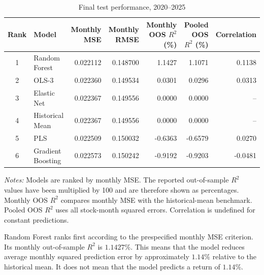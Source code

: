 \documentclass[11pt,a4paper]{article}
\begin{document}
\begin{table}[H]
\centering
\caption{Final test performance, 2020--2025}
\label{tab:test-results}

\small
\setlength{\tabcolsep}{3.8pt}

\begin{tabular}{clrrrrr}
\toprule
Rank
& Model
& Monthly MSE
& Monthly RMSE
& Monthly OOS \(R^2\) (\%)
& Pooled OOS \(R^2\) (\%)
& Correlation \\
\midrule

1 & Random Forest
  & 0.022112 & 0.148700 &  1.1427 &  1.1071 &  0.1138 \\

2 & OLS-3
  & 0.022360 & 0.149534 &  0.0301 &  0.0296 &  0.0313 \\

3 & Elastic Net
  & 0.022367 & 0.149556 &  0.0000 &  0.0000 &  -- \\

4 & Historical Mean
  & 0.022367 & 0.149556 &  0.0000 &  0.0000 &  -- \\

5 & PLS
  & 0.022509 & 0.150032 & -0.6363 & -0.6579 &  0.0270 \\

6 & Gradient Boosting
  & 0.022573 & 0.150242 & -0.9192 & -0.9203 & -0.0481 \\

\bottomrule
\end{tabular}

\vspace{0.3em}

\begin{minipage}{0.94\textwidth}
\footnotesize
\textit{Notes:}
Models are ranked by monthly MSE. The reported out-of-sample \(R^2\) values
have been multiplied by 100 and are therefore shown as percentages. Monthly
OOS \(R^2\) compares monthly MSE with the historical-mean benchmark. Pooled
OOS \(R^2\) uses all stock-month squared errors. Correlation is undefined for
constant predictions.
\end{minipage}
\end{table}

Random Forest ranks first according to the prespecified monthly MSE criterion.
Its monthly out-of-sample \(R^2\) is \(1.1427\%\). This means that the model
reduces average monthly squared prediction error by approximately \(1.14\%\)
relative to the historical mean. It does not mean that the model predicts a
return of \(1.14\%\).
\end{document}

